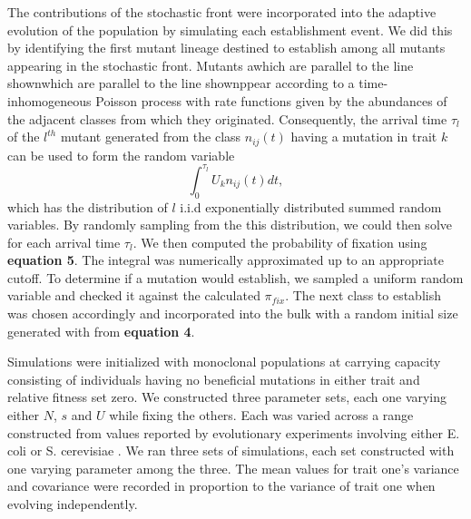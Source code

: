 \documentclass[11pt,twocolumn]{article}
\begin{document}
The contributions of the stochastic front were incorporated into the adaptive evolution of the population by simulating each establishment event. We did this by identifying the first mutant lineage destined to establish among all mutants appearing in the stochastic front. Mutants awhich are parallel to the line shownwhich are parallel to the line shownppear according to a time-inhomogeneous Poisson process with rate functions given by the abundances of the adjacent classes from which they originated. Consequently, the arrival time $\tau_l$ of the $l^{th}$ mutant generated from the class $n_{ij}(t)$ having a mutation in trait $k$ can be used to form the random variable
% 
% 
\[ 
\int_0^{\tau_l} U_k n_{ij}(t) dt ,
\] 
which has the distribution of $l$ i.i.d exponentially distributed summed random variables. By randomly sampling from the this distribution, we could then solve for each arrival time $\tau_l$.   We then computed the probability of fixation using \textbf{equation 5}.  The integral was numerically approximated up to an appropriate cutoff.  To determine if a mutation would establish, we sampled a uniform random variable and checked it against the calculated $\pi_{fix}$. The next class to establish was chosen accordingly and incorporated into the bulk with a random initial size generated with from \textbf{equation 4}.\par
% 
% 

Simulations were initialized with monoclonal populations at carrying capacity consisting of individuals having no beneficial mutations in either trait and relative fitness set zero. We constructed three parameter sets, each one varying either $N$, $s$ and $U$ while fixing the others. Each was varied across a range constructed from values reported by evolutionary experiments involving either E. coli or S. cerevisiae \citep{desai2007speed,Levy2015,Perfeito2007}. We ran three sets of simulations, each set constructed with one varying parameter among the three. The mean values for trait one's variance and covariance were recorded in proportion to the variance of trait one when evolving independently.  
\end{document}
